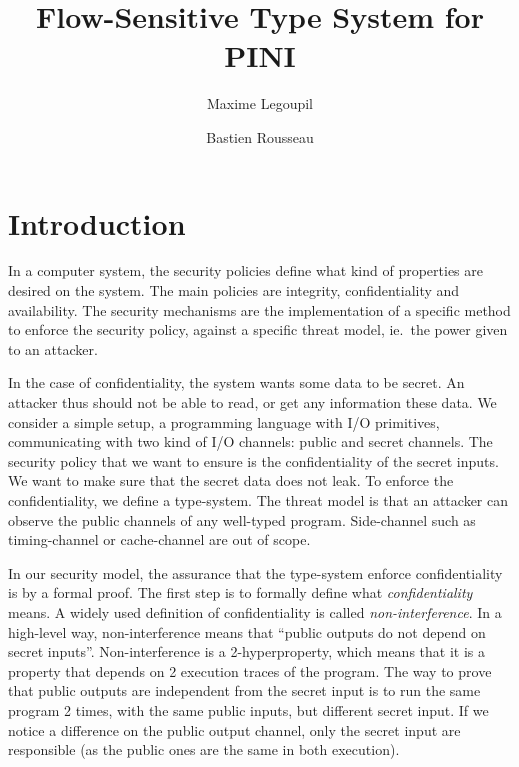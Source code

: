 \documentclass[10pt]{article}
\title{
   Flow-Sensitive Type System for PINI
}
\author{Maxime Legoupil \and Bastien Rousseau }
\begin{document}
\maketitle


\thispagestyle{empty}

\section{Introduction}
\label{sec:intro}

In a computer system, the security policies define what kind of properties are desired on the
system. The main policies are integrity, confidentiality and availability.
The security mechanisms are the implementation of a specific method to enforce the security policy,
against a specific threat model, ie.\ the power given to an attacker.

In the case of confidentiality, the system wants some data to be secret. An attacker thus should not
be able to read, or get any information these data. We consider a simple setup, a programming
language with I/O primitives, communicating with two kind of I/O channels: public and secret
channels.
The security policy that we want to ensure is the confidentiality of the secret inputs. We
want to make sure that the secret data does not leak. To enforce the confidentiality, we define a
type-system.
The threat model is that an attacker can observe the public channels of any well-typed program. Side-channel such as timing-channel or cache-channel are out of scope.

In our security model, the assurance that the type-system enforce confidentiality is by a formal
proof. The first step is to formally define what \emph{confidentiality} means. A widely used
definition of confidentiality is called \emph{non-interference}. In a high-level way,
non-interference means that ``public outputs do not depend on secret inputs''.
Non-interference is a 2-hyperproperty, which means that it is a property that depends on 2
execution traces of the program. The way to prove that public outputs are independent from the
secret input is to run the same program 2 times, with the same public inputs, but different secret
input. If we notice a difference on the public output channel, only the secret input are responsible
(as the public ones are the same in both execution).
\end{document}

